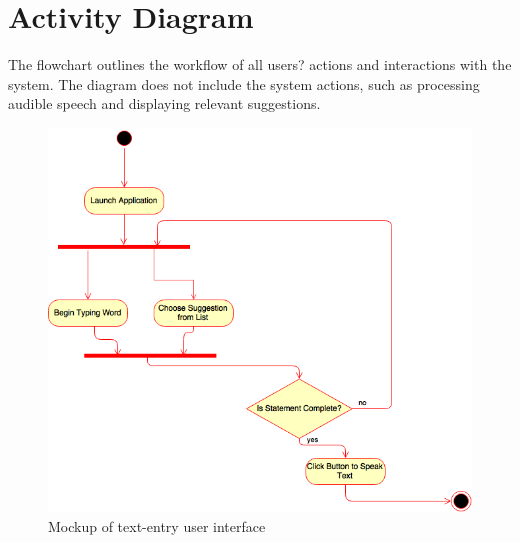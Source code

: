 \chapter{Activity Diagram}

The flowchart  outlines the workflow of all users? actions and interactions with the system. The diagram does not include the system actions, such as processing audible speech and displaying relevant suggestions.

\begin{figure}[htb]
\centering
\includegraphics[width=\textwidth]{ActivityDiagram.png}
\caption{Mockup of text-entry user interface}
\label{fig:ui}
\end{figure}
